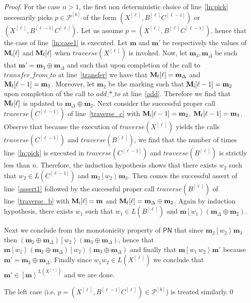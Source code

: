 \documentclass{fsttcs}
\def\mmap{\mathbf{m}}
\newcommand{\fire}[1]{\left[ {#1}\right\rangle}
\def\prod{\mathcal{P}}
\def\pn{\mathsf{PN}}
\def\addto{\mathit{add\_\mathord{\ast}\_to}}
\begin{document}
\begin{proof}
For the case \(n>1\), the first non deterministic choice of line~\ref{ln:pick}
necessarily picks \(p\in\prod^{[k]}\) of the form \(
(X^{[\ell]},B^{[\ell]}C^{[\ell-1]})\) or \(
(X^{[\ell]},B^{[\ell-1]}C^{[\ell]})\). Let us assume 
\(p=(X^{[\ell]},B^{[\ell]}C^{[\ell-1]})\), hence that the case of
line~\ref{ln:case1} is executed.  Let \(\mmap\) and \(\mmap'\) be respectively
the values of \(\mathbf{M_{\sf i}}[\ell]\) and \(\mathbf{M_{\sf f}}[\ell]\)
when \(\mathit{traverse}(X^{[\ell]})\) is invoked. Now, let
\(\mmap_3,\mmap_{\Delta}\) be such that \(\mmap'=\mmap_3\oplus\mmap_{\Delta}\)
and such that upon completion of the call to \(\mathit{transfer\_from\_to}\) at
line~\ref{transfer} we have that \(\mathbf{M_{\sf f}}[\ell]=\mmap_{\Delta}\)
and \(\mathbf{M_{\sf f}}[\ell-1]=\mmap_3\).  Moreover, let \(\mmap_2\) be the
marking such that \(\mathbf{M_{\sf i}}[\ell-1]=\mmap_2\) upon completion of the
call to \(\addto\) at line~\ref{add}. Therefore we find that
\(\mathbf{M_{\sf f}}[\ell]\) is updated to \(\mmap_{\Delta}\oplus\mmap_2\).
Next consider the successful proper call \(\mathit{traverse}(C^{[\ell-1]})\) of line~\ref{traverse_c} with
\({\mathbf{M_{\sf i}}[\ell-1]}=\mmap_2\), \({\mathbf{M_{\sf f}}[\ell-1]}=\mmap_3\).
Observe that because the execution of \(\mathit{traverse}(X^{[\ell]})\) yields the calls
\(\mathit{traverse}(C^{[\ell-1]})\) and \(\mathit{traverse}(B^{[\ell]})\), we find that the
number of times line~\ref{ln:pick} is executed in \(\mathit{traverse}(C^{[\ell-1]})\) and \(\mathit{traverse}(B^{[\ell]})\)
is strictly less than \(n\).
Therefore, the induction hypothesis shows that there exists \(w_2\) such that
\(w_2\in L(C^{[\ell-1]})\) and \(\mmap_2\fire{w_2}\mmap_3\).  Then
comes the successful assert of line~\ref{assert1} followed by the successful
proper call \(\mathit{traverse}(B^{[\ell]})\) of line~\ref{traverse_b} with
\({\mathbf{M_{\sf i}}[\ell]}=\mmap\) and
\({\mathbf{M_{\sf f}}[\ell]}=\mmap_{\Delta}\oplus\mmap_2\).
Again by induction hypothesis, there exists \(w_1\) such that
\(w_1\in L(B^{[\ell]})\) and \(\mmap\fire{w_1} (\mmap_{\Delta}\oplus \mmap_2)\).

Next we conclude from the monotonicity property of \(\pn\) that since
\(\mmap_2\fire{w_2}\mmap_3\) then
\( (\mmap_2\oplus\mmap_{\Delta})\fire{w_2}(\mmap_3\oplus\mmap_{\Delta})\), hence
that
\(\mmap\fire{w_1}(\mmap_2\oplus\mmap_{\Delta})\fire{w_2}(\mmap_3\oplus\mmap_{\Delta})\)
and finally that \(\mmap\fire{w_1\, w_2}\mmap'\) because \(\mmap'=\mmap_3\oplus\mmap_{\Delta}\).  Finally since
\(w_1w_2\in L(X^{[\ell]})\) we
conclude that \(\mmap'\in\fire{\mmap}^{L(X^{[\ell]})}\) and we are
done.

The left case (i.e. \(p=(X^{[\ell]},B^{[\ell-1]}C^{[\ell]})\in\prod^{[k]}\)) is treated similarly.\qed
\end{proof}
\pagebreak
 
\end{document}
